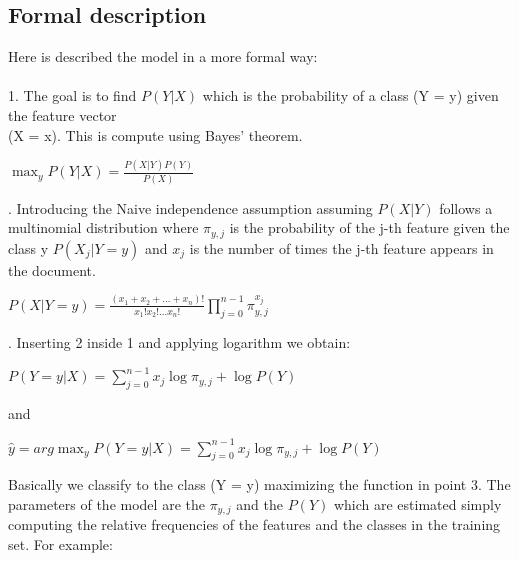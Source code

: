 \documentclass{article}
\begin{document}
\subsection*{Formal description}
Here is described the model in a more formal way:\\
\\
1. The goal is to find $P(Y|X)$ which is the probability of a class (Y = y) given the feature vector \\
(X = x). This is compute using Bayes' theorem.
    \vspace{0.3cm}\begin{center} $\max_y{P(Y|X)} = \frac{P(X|Y)P(Y)}{P(X)}$ \end{center}\vspace{0.3cm}

. Introducing the Naive independence assumption assuming $P(X|Y)$ follows a multinomial distribution where $\pi_{y,j}$ is the probability of the j-th feature given the class y 
$P(X_j|Y=y)$ and ${x_j}$ is the number of times the j-th feature appears in the document.\\
    \vspace{0.3cm}\begin{center} 
        $
        P(X|Y = y) = \frac{(x_1 + x_2 + ... + x_n)!}{x_1!x_2!...x_n!} \prod_{j=0}^{n-1} \pi_{y,j}^{x_j}
        $ \end{center}\vspace{0.3cm}

. Inserting 2 inside 1 and applying logarithm we obtain:
    \vspace{0.3cm}\begin{center} ${P(Y = y|X)} = \sum_{j=0}^{n-1} x_j \log{\pi_{y,j}} + \log{P(Y)}$ \end{center}\vspace{0cm}
    \begin{center} and \end{center}\vspace{0cm}
    \begin{center} $\hat{y} = arg\max_y {P(Y = y|X)} = \sum_{j=0}^{n-1} x_j \log{\pi_{y,j}} + \log{P(Y)}$ \end{center}\vspace{0.3cm}

\noindent
Basically we classify to the class (Y = y) maximizing the function in point 3. The parameters of the model are the $\pi_{y,j}$ and the $P(Y)$ which are estimated simply
computing the relative frequencies of the features and the classes in the training set. For example:
\end{document}
